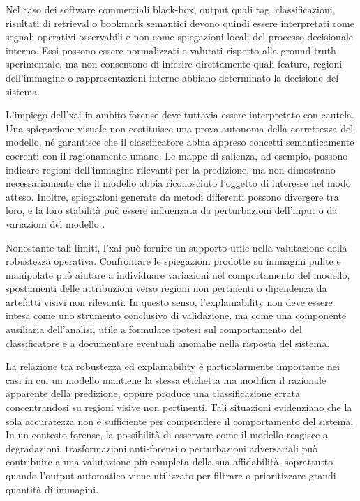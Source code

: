 Nel caso dei software commerciali black-box, output quali tag, classificazioni,
risultati di retrieval o bookmark semantici devono quindi essere interpretati
come segnali operativi osservabili e non come spiegazioni locali del processo
decisionale interno. Essi possono essere normalizzati e valutati rispetto alla
ground truth sperimentale, ma non consentono di inferire direttamente quali
feature, regioni dell'immagine o rappresentazioni interne abbiano determinato la
decisione del sistema.

L'impiego dell'\gls{xai} in ambito forense deve tuttavia essere interpretato con
cautela. Una spiegazione visuale non costituisce una prova autonoma della
correttezza del modello, né garantisce che il classificatore abbia appreso
concetti semanticamente coerenti con il ragionamento umano. Le mappe di
salienza, ad esempio, possono indicare regioni dell'immagine rilevanti per la
predizione, ma non dimostrano necessariamente che il modello abbia riconosciuto
l'oggetto di interesse nel modo atteso. Inoltre, spiegazioni generate da metodi
differenti possono divergere tra loro, e la loro stabilità può essere
influenzata da perturbazioni dell'input o da variazioni del modello
\cite{Adadi2018,Carvalho2019}.

Nonostante tali limiti, l'\gls{xai} può fornire un supporto utile nella
valutazione della robustezza operativa. Confrontare le spiegazioni prodotte su
immagini pulite e manipolate può aiutare a individuare variazioni nel
comportamento del modello, spostamenti delle attribuzioni verso regioni non
pertinenti o dipendenza da artefatti visivi non rilevanti. In questo senso,
l'explainability non deve essere intesa come uno strumento conclusivo di
validazione, ma come una componente ausiliaria dell'analisi, utile a formulare
ipotesi sul comportamento del classificatore e a documentare eventuali anomalie
nella risposta del sistema.

La relazione tra robustezza ed explainability è particolarmente importante nei
casi in cui un modello mantiene la stessa etichetta ma modifica il razionale
apparente della predizione, oppure produce una classificazione errata
concentrandosi su regioni visive non pertinenti. Tali situazioni evidenziano che
la sola accuratezza non è sufficiente per comprendere il comportamento del
sistema. In un contesto forense, la possibilità di osservare come il modello
reagisce a degradazioni, trasformazioni anti-forensi o perturbazioni
adversariali può contribuire a una valutazione più completa della sua
affidabilità, soprattutto quando l'output automatico viene utilizzato per
filtrare o prioritizzare grandi quantità di immagini.

